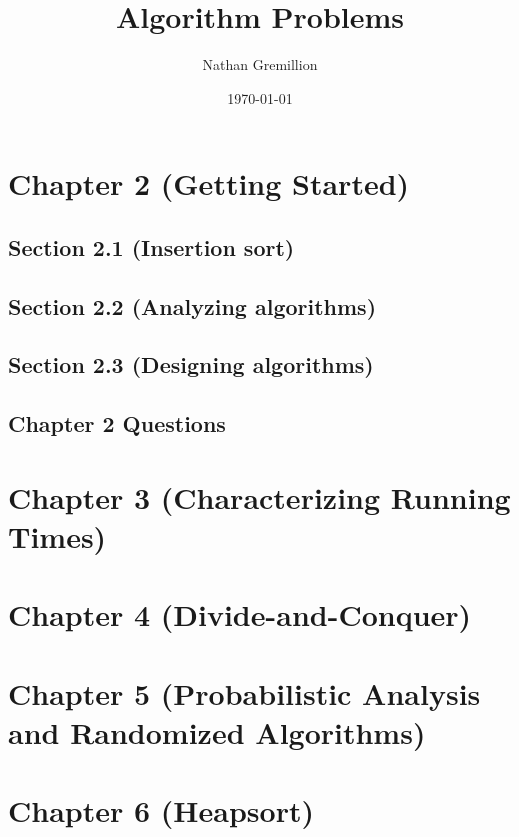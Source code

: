 \documentclass[11pt]{article}
\begin{document}
\title{Algorithm Problems}
\author{Nathan Gremillion}
\date{\today}
\maketitle

\section*{Chapter 2 (Getting Started)}

\subsection*{Section 2.1 (Insertion sort)}


\subsection*{Section 2.2 (Analyzing algorithms)}


\subsection*{Section 2.3 (Designing algorithms)}


\subsection*{Chapter 2 Questions}


\newpage

\section*{Chapter 3 (Characterizing Running Times)}
\newpage

\section*{Chapter 4 (Divide-and-Conquer)}
\newpage

\section*{Chapter 5 (Probabilistic Analysis and Randomized Algorithms)}
\newpage

\section*{Chapter 6 (Heapsort)}
\newpage
\end{document}
